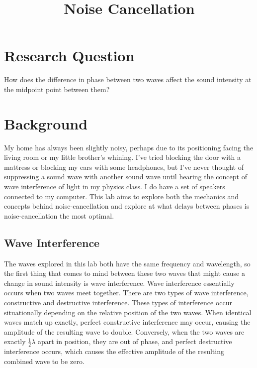 \documentclass[index]{subfiles}
\begin{document}
\title{Noise Cancellation}
\date{}
\author{}
\maketitle

\section{Research Question}

How does the difference in phase between two waves affect the sound intensity at the midpoint point between them?

\section{Background}

My home has always been slightly noisy, perhaps due to its positioning facing the living room or my little brother's whining. I've tried blocking the door with a mattress or blocking my ears with some headphones, but I've never thought of suppressing a sound wave with another sound wave until hearing the concept of wave interference of light in my physics class. I do have a set of speakers connected to my computer. This lab aims to explore both the mechanics and concepts behind noise-cancellation and explore at what delays between phases is noise-cancellation the most optimal.

\subsection{Wave Interference}

The waves explored in this lab both have the same frequency and wavelength, so the first thing that comes to mind between these two waves that might cause a change in sound intensity is wave interference.
Wave interference essentially occurs when two waves meet together. There are two types of wave interference, constructive and destructive interference. These types of interference occur situationally depending on the relative position of the two waves. When identical waves match up exactly, perfect constructive interference may occur, causing the amplitude of the resulting wave to double. Conversely, when the two waves are exactly \(\frac{1}{2}\lambda\) apart in position, they are out of phase, and perfect destructive interference occurs, which causes the effective amplitude of the resulting combined wave to be zero.\cite{openstax}
\end{document}
